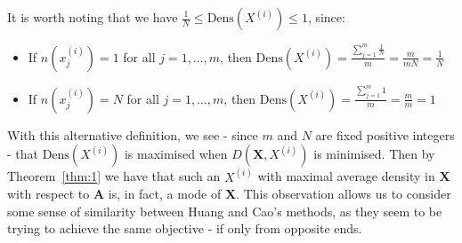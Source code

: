 \begin{remark}
    It is worth noting that we have \(\frac{1}{N} \leq \text{Dens}(X^{(i)})
    \leq 1\), since:		
	\begin{itemize}	
        \item If \(n(x_j^{(i)}) = 1\) for all \(j = 1, \ldots, m\), then
            \(\text{Dens}(X^{(i)}) = \frac{\sum_{j=1}^m \frac{1}{N}}{m} =
            \frac{m}{mN} = \frac{1}{N}\)
        \item If \(n(x_j^{(i)}) = N\) for all \(j = 1, \ldots, m\), then
            \(\text{Dens}(X^{(i)}) = \frac{\sum_{j=1}^m 1}{m} = \frac{m}{m} =
            1\)
	\end{itemize}
\end{remark}

\begin{singlespace}
    
\end{singlespace}

\begin{remark}
    With this alternative definition, we see \-- since \(m\) and \(N\) are fixed
    positive integers \-- that \(\text{Dens}(X^{(i)})\) is maximised when
    \(D(\textbf{X}, X^{(i)})\) is minimised. Then by Theorem~\ref{thm:1} we have
    that such an \(X^{(i)}\) with maximal average density in \textbf{X} with
    respect to \textbf{A} is, in fact, a mode of \textbf{X}. This observation
    allows us to consider some sense of similarity between Huang and Cao's
    methods, as they seem to be trying to achieve the same objective \-- if only
    from opposite ends.
\end{remark}

%
